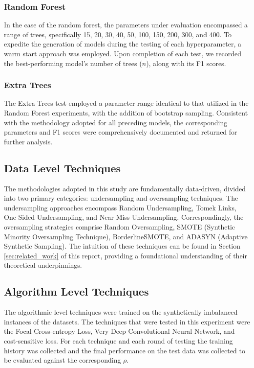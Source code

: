 \documentclass[journal]{IEEEtran}
\begin{document}
	\subsubsection{Random Forest}
	In the case of the random forest, the parameters under evaluation encompassed a range of trees, specifically 15, 20, 30, 40, 50, 100, 150, 200, 300, and 400. To expedite the generation of models during the testing of each hyperparameter, a warm start approach was employed. Upon completion of each test, we recorded the best-performing model's number of trees ($n$), along with its F1 scores.
	
	\subsubsection{Extra Trees}
	The Extra Trees test employed a parameter range identical to that utilized in the Random Forest experiments, with the addition of bootstrap sampling. Consistent with the methodology adopted for all preceding models, the corresponding parameters and F1 scores were comprehensively documented and returned for further analysis.


\subsection{Data Level Techniques}

	The methodologies adopted in this study are fundamentally data-driven, 
	divided into two primary categories: undersampling and oversampling techniques. 
	The undersampling approaches encompass Random Undersampling, Tomek Links, One-Sided Undersampling, and Near-Miss Undersampling. 
	Correspondingly, the oversampling strategies comprise Random Oversampling, SMOTE (Synthetic Minority Oversampling Technique), BorderlineSMOTE, and ADASYN (Adaptive Synthetic Sampling). 
	The intuition of these techniques can be found in Section \ref{sec:related_work} of this report, providing a foundational understanding of their theoretical underpinnings.
		

\subsection{Algorithm Level Techniques}

	The algorithmic level techniques were trained on the synthetically imbalanced instances of the datasets.
	The techniques that were tested in this experiment were the Focal Cross-entropy Loss,
	Very Deep Convolutional Neural Network, and cost-sensitive loss.
	For each technique and each round of testing the training history was collected
	and the final performance on the test data was collected to be evaluated against the
	corresponding $\rho$.
\end{document}
